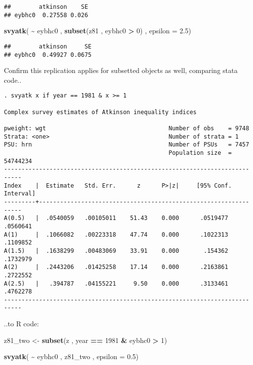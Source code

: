 \documentclass[
]{book}
\newenvironment{Shaded}{\begin{snugshade}}{\end{snugshade}}
\newcommand{\AttributeTok}[1]{\textcolor[rgb]{0.13,0.29,0.53}{#1}}
\newcommand{\DecValTok}[1]{\textcolor[rgb]{0.00,0.00,0.81}{#1}}
\newcommand{\FloatTok}[1]{\textcolor[rgb]{0.00,0.00,0.81}{#1}}
\newcommand{\FunctionTok}[1]{\textcolor[rgb]{0.13,0.29,0.53}{\textbf{#1}}}
\newcommand{\NormalTok}[1]{#1}
\newcommand{\OtherTok}[1]{\textcolor[rgb]{0.56,0.35,0.01}{#1}}
\newcommand{\SpecialCharTok}[1]{\textcolor[rgb]{0.81,0.36,0.00}{\textbf{#1}}}
\begin{document}
\begin{verbatim}
##        atkinson    SE
## eybhc0  0.27558 0.026
\end{verbatim}

\begin{Shaded}
\begin{Highlighting}[]
\FunctionTok{svyatk}\NormalTok{( }\SpecialCharTok{\textasciitilde{}}\NormalTok{ eybhc0 , }\FunctionTok{subset}\NormalTok{(z81 , eybhc0 }\SpecialCharTok{\textgreater{}} \DecValTok{0}\NormalTok{) , }\AttributeTok{epsilon =} \FloatTok{2.5}\NormalTok{)}
\end{Highlighting}
\end{Shaded}

\begin{verbatim}
##        atkinson     SE
## eybhc0  0.49927 0.0675
\end{verbatim}

Confirm this replication applies for subsetted objects as well, comparing stata code..

\begin{verbatim}
. svyatk x if year == 1981 & x >= 1

Complex survey estimates of Atkinson inequality indices
 
pweight: wgt                                   Number of obs    = 9748
Strata: <one>                                  Number of strata = 1
PSU: hrn                                       Number of PSUs   = 7457
                                               Population size  = 54744234
---------------------------------------------------------------------------
Index    |  Estimate   Std. Err.      z      P>|z|     [95% Conf. Interval]
---------+-----------------------------------------------------------------
A(0.5)   |  .0540059   .00105011    51.43    0.000      .0519477   .0560641
A(1)     |  .1066082   .00223318    47.74    0.000      .1022313   .1109852
A(1.5)   |  .1638299   .00483069    33.91    0.000       .154362   .1732979
A(2)     |  .2443206   .01425258    17.14    0.000      .2163861   .2722552
A(2.5)   |   .394787   .04155221     9.50    0.000      .3133461   .4762278
---------------------------------------------------------------------------
\end{verbatim}

..to R code:

\begin{Shaded}
\begin{Highlighting}[]
\NormalTok{z81\_two }\OtherTok{\textless{}{-}} \FunctionTok{subset}\NormalTok{(z , year }\SpecialCharTok{==} \DecValTok{1981} \SpecialCharTok{\&}\NormalTok{ eybhc0 }\SpecialCharTok{\textgreater{}} \DecValTok{1}\NormalTok{)}

\FunctionTok{svyatk}\NormalTok{( }\SpecialCharTok{\textasciitilde{}}\NormalTok{ eybhc0 , z81\_two , }\AttributeTok{epsilon =} \FloatTok{0.5}\NormalTok{)}
\end{Highlighting}
\end{Shaded}
\end{document}
